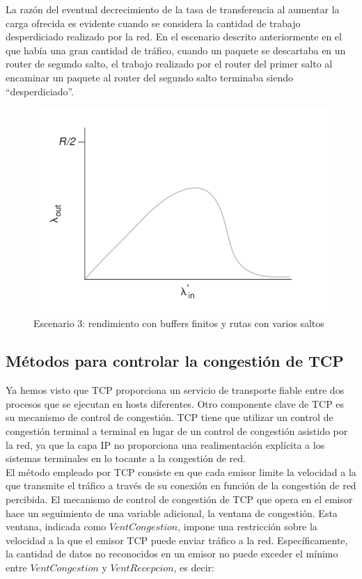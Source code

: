 \documentclass[a4paper,11pt]{article}
\begin{document}
La razón del eventual decrecimiento de la tasa de transferencia al aumentar la carga ofrecida
es evidente cuando se considera la cantidad de trabajo desperdiciado realizado por la red. En el
escenario descrito anteriormente en el que había una gran cantidad de tráfico, cuando un paquete
se descartaba en un router de segundo salto, el trabajo realizado por el router del primer salto al
encaminar un paquete al router del segundo salto terminaba siendo “desperdiciado”. 

\begin{figure}[h]
\centering
\caption{Escenario 3: rendimiento con buffers finitos y rutas con varios saltos}
\includegraphics[scale=1,width=1\textwidth]{grafica_escenario_3.png}

\end{figure}

\subsection{Métodos para controlar la congestión de TCP}
Ya hemos visto que TCP proporciona un servicio de transporte fiable entre dos procesos que se ejecutan en hosts diferentes. Otro componente clave de TCP es su mecanismo de control de congestión. TCP tiene que utilizar un control de congestión terminal a terminal en lugar de un control de congestión asistido por la red, ya que la capa IP no proporciona una realimentación explícita a los sistemas terminales en lo tocante a la congestión de red. \\

El método empleado por TCP consiste en que cada emisor limite la velocidad a la que transmite el tráfico a través de su conexión en función de la congestión de red percibida. El mecanismo de control de congestión de TCP que opera en el emisor hace un seguimiento de una variable adicional, la ventana de congestión. Esta ventana, indicada como $VentCongestion$, impone una restricción sobre la velocidad a la que el emisor TCP puede enviar tráfico a la red. Específicamente, la cantidad de datos no reconocidos en un emisor no puede exceder el mínimo entre $VentCongestion$ y $VentRecepcion$, es decir:
\end{document}
